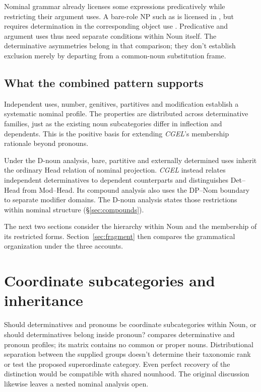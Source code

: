 \documentclass[12pt]{article}
\begin{document}
Nominal grammar already licenses some expressions predicatively while restricting their argument uses. A bare-role NP such as  is licensed in , but requires determination in the corresponding object use  \citep[328]{huddleston2002}. Predicative and argument uses thus need separate conditions within Noun itself. The determinative asymmetries belong in that comparison; they don't establish exclusion merely by departing from a common-noun substitution frame.

\subsection{What the combined pattern supports}\label{sec:cumulative}

Independent uses, number, genitives, partitives and modification establish a systematic nominal profile. The properties are distributed across determinative families, just as the existing noun subcategories differ in inflection and dependents. This is the positive basis for extending \textit{CGEL}'s membership rationale beyond pronouns.

Under the D-noun analysis, bare, partitive and externally determined uses inherit the ordinary Head relation of nominal projection. \textit{CGEL} instead relates independent determinatives to dependent counterparts and distinguishes Det--Head from Mod--Head. Its compound analysis also uses the DP--Nom boundary to separate modifier domains. The D-noun analysis states those restrictions within nominal structure (§\ref{sec:compounds}).

The next two sections consider the hierarchy within Noun and the membership of its restricted forms. Section~\ref{sec:fragment} then compares the grammatical organization under the three accounts.

\section{Coordinate subcategories and inheritance}\label{sec:inheritance}

Should determinatives and pronouns be coordinate subcategories within Noun, or should determinatives belong inside pronoun? \textcite{reynolds2021} compares determinative and pronoun profiles; its matrix contains no common or proper nouns. Distributional separation between the supplied groups doesn't determine their taxonomic rank or test the proposed superordinate category. Even perfect recovery of the distinction would be compatible with shared nounhood. The original discussion likewise leaves a nested nominal analysis open.
\end{document}
